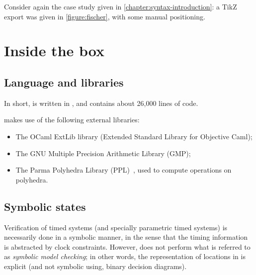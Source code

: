 \begin{example}
	Consider again the case study given in \cref{chapter:syntax-introduction}: a TikZ export was given in \cref{figure:fischer}, with some manual positioning.
\end{example}






\chapter{Inside the box}


\section{Language and libraries}

In short, \imitator{} is written in \ocaml{}, and contains about 26,000 lines of code.

\imitator{} makes use of the following external libraries:

\begin{itemize}
	\item The OCaml ExtLib library (Extended Standard Library for Objective Caml);
	\item The GNU Multiple Precision Arithmetic Library (GMP);
	\item The Parma Polyhedra Library (PPL)~\cite{BHZ08}, used to compute operations on polyhedra.
\end{itemize}


\section{Symbolic states}

Verification of timed systems (and specially parametric timed systems) is necessarily done in a symbolic manner, in the sense that the timing information is abstracted by clock constraints.
However, \imitator{} does not perform what is referred to as \emph{symbolic model checking}; in other words, the representation of locations in \imitator{} is explicit (and not symbolic using, \eg{} binary decision diagrams).

